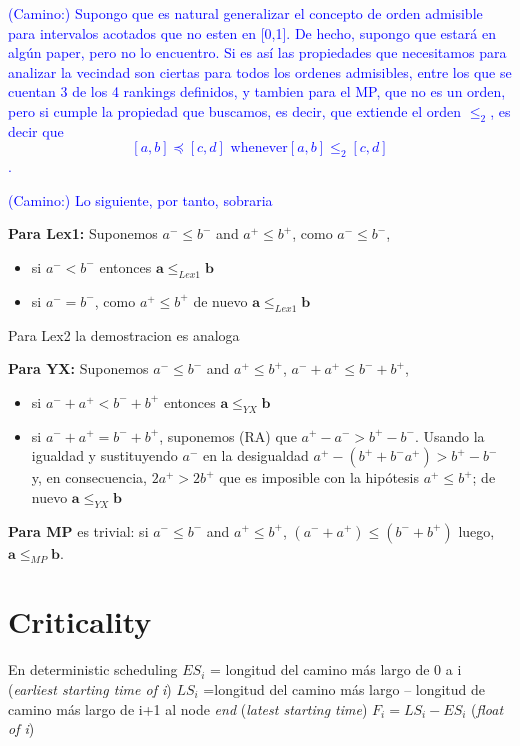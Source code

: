 \documentclass[preprint]{elsarticle}
\newcommand{\textcam}[1]{\textcolor{blue}{(Camino:) #1}}
\begin{document}
\textcam{Supongo que es natural generalizar el concepto de orden admisible para intervalos acotados que no esten en [0,1]. De hecho, supongo que estará en algún paper, pero no lo encuentro. Si es así las propiedades que necesitamos para analizar la vecindad son ciertas para todos los ordenes admisibles, entre los que se cuentan 3 de los 4 rankings definidos, y tambien para el MP, que no es un orden, pero si cumple la propiedad que buscamos, es decir, que extiende el orden $\le_2$, es decir que $$[a,b] \preceq [c,d] \text{ whenever} [a,b] \leq_2 [c,d]$$ .} 

\textcam{Lo siguiente, por tanto, sobraria}

\textbf{Para Lex1:} Suponemos $a^- \leq b^-$ and $a^+ \leq b^+$, como $a^- \leq b^-$, 
\begin{itemize}
\item si $a^- < b^-$ entonces $\mathbf{a} \leq_{Lex1} \mathbf{b}$
\item si  $a^- = b^-$, como $a^+ \leq b^+$ de nuevo $\mathbf{a} \leq_{Lex1} \mathbf{b}$
\end{itemize}

Para Lex2 la demostracion es analoga

\textbf{Para YX:} Suponemos $a^- \leq b^-$ and $a^+ \leq b^+$, $a^-+a^+ \leq b^-+b^+$, 
\begin{itemize}
\item si $a^-+a^+<b^-+b^+$ entonces $\mathbf{a} \leq_{YX} \mathbf{b}$
\item si  $a^-+a^+ = b^-+b^+$, suponemos (RA) que $a^+ - a^- > b^+ - b^-$. Usando la igualdad y sustituyendo $a^-$ en la desigualdad $a^+ - (b^+ + b^ - a^+) >  b^+ - b^-$ y, en consecuencia, $2a^+ > 2b^+$ que es imposible con la hipótesis  $a^+ \leq b^+$;
de nuevo $\mathbf{a} \leq_{YX} \mathbf{b}$
\end{itemize}

\textbf{Para MP} es trivial: si $a^- \leq b^-$ and $a^+ \leq b^+$, $ (a^- + a^+) \leq (b^- + b^+)$ luego, $\mathbf{a} \leq_{MP} \mathbf{b}$. 



\section{Criticality}

En deterministic scheduling
$ES_i$ = longitud del camino m\'as largo de 0 a i (\textit{earliest starting time of i})
$LS_i$ =longitud del camino m\'as largo – longitud de camino m\'as largo de i+1 al node \textit{end} (\textit{latest starting time})
$F_i = LS_i - ES_i$ (\textit{float of i})
\end{document}
